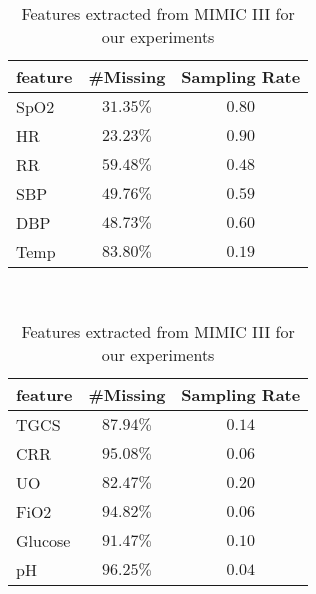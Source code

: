 \documentclass{article} \usepackage{iclr2019_conference,times}
\begin{document}
\begin{table}[h]
\centering
\caption{Features extracted from MIMIC III for our experiments}
\label{table:mis}
\begin{tabular}[h]{l c c}
                
                 \toprule
                 {feature} & {\#Missing} & {Sampling Rate}\\
                    \midrule
                    SpO2 & $31.35\%$ & $0.80$\\
                    HR  & $23.23\%$ & $0.90$\\
                    RR & $59.48\%$  & $0.48$\\
                    SBP & $49.76\%$ & $0.59$\\
                    DBP & $48.73\%$ & $0.60$\\
                    Temp & $83.80\%$& $0.19$\\
  
                    \bottomrule
                    \end{tabular}  
                    \,\,\,\,\,\,
\begin{tabular}[h]{l c c}
                 \toprule
                 {feature} & {\#Missing} & {Sampling Rate}\\
                    \midrule
                    TGCS & $87.94\%$& $0.14$\\
                    CRR &$95.08\%$& $0.06$\\
                    UO & $82.47\%$&$0.20$\\
                    FiO2 &$94.82\%$&$0.06$\\
                    Glucose &$91.47\%$&$0.10$\\
                    pH &$96.25\%$&$0.04$\\
                    \bottomrule
                    \end{tabular}
\end{table}
\end{document}
